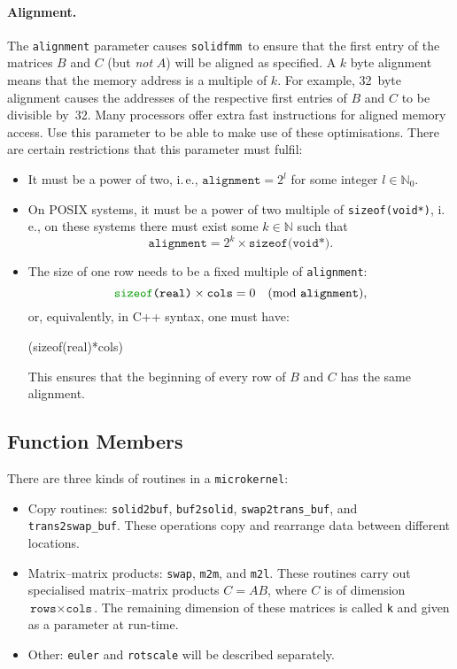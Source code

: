 \documentclass{scrbook}
\newcommand{\colour}{\color}
\newcommand{\solidfmm}{\texttt{solidfmm}}
\newcommand{\naturals}{\ensuremath{\mathbb{N}}}
\begin{document}
\paragraph{Alignment.}
The \lstinline|alignment| parameter causes \solidfmm\ to ensure that
the first entry of the matrices $B$ and $C$ (but \emph{not} $A$) will be aligned
as specified. A $k$ byte alignment means that the memory address is a multiple
of $k$. For example, 32~byte alignment causes the addresses of the respective
first entries of $B$ and $C$ to be divisible by~32. Many processors offer extra
fast instructions for aligned memory access. Use this parameter to be able to
make use of these optimisations. There are certain restrictions that this
parameter must fulfil:
\begin{itemize}
\item It must be a power of two, i.\,e., $\texttt{alignment}=2^l$ for some
integer $l\in\naturals_0$.
\item On POSIX systems, it must be a power of two multiple of
\lstinline[style=cpp]|sizeof(void*)|, i.\,e., on these systems there must exist
some $k\in\naturals$ such that
\begin{equation*}
\texttt{alignment} = 2^k\times\texttt{sizeof(void*)}.
\end{equation*}
\item The size of one row needs to be a fixed multiple of \lstinline|alignment|:
\begin{equation*}
\texttt{{\colour{green!60!black}sizeof}(real)}\times\texttt{cols} = 0 \quad
(\mathrm{mod}\ \texttt{alignment}),
\end{equation*}
or, equivalently, in C++ syntax, one must have:
\begin{cppcode*}
(sizeof(real)*cols) %
\end{cppcode*}
This ensures that the beginning of every row of $B$ and $C$ has the same
alignment.
\end{itemize}

\subsection{Function Members}
There are three kinds of routines in a \lstinline|microkernel|:
\begin{itemize}
\item Copy routines: \lstinline|solid2buf|, \lstinline|buf2solid|,
\lstinline|swap2trans_buf|, and \lstinline|trans2swap_buf|. These
operations copy and rearrange data between different locations.
\item Matrix--matrix products: \lstinline|swap|, \lstinline|m2m|, and
\lstinline|m2l|. These routines carry out specialised matrix--matrix
products $C=AB$, where $C$ is of dimension $\texttt{rows}\times
\texttt{cols}$. The remaining dimension of these matrices is
called \lstinline|k| and given as a parameter at run-time.
\item Other: \lstinline|euler| and \lstinline|rotscale| will be
described separately.
\end{itemize}
\end{document}
